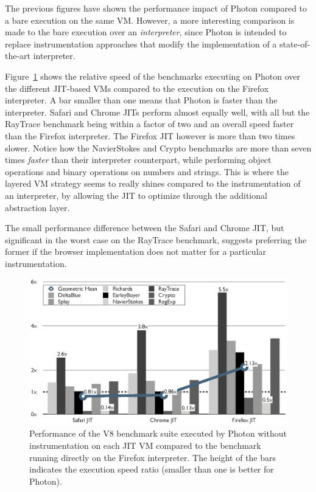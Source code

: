 The previous figures have shown the performance impact of Photon compared to a
bare execution on the same VM. However, a more interesting comparison is made
to the bare execution over an \textit{interpreter}, since Photon is intended to
replace instrumentation approaches that modify the implementation of a
state-of-the-art interpreter.

Figure~\ref{fig:perf-no-instrumentation-photon-vs-interpreter} shows the
relative speed of the benchmarks executing on Photon over the different
JIT-based VMs compared to the execution on the Firefox interpreter. A bar
smaller than one means that Photon is faster than the interpreter. Safari and
Chrome JITs perform almost equally well, with all but the RayTrace benchmark
being within a factor of two and an overall speed faster than the Firefox
interpreter. The Firefox JIT however is more than two times slower. Notice how
the NavierStokes and Crypto benchmarks are more than seven times \textit{faster}
than their interpreter counterpart, while performing object operations and
binary operations on numbers and strings. This is where the layered VM strategy
seems to really shines compared to the instrumentation of an interpreter, by
allowing the JIT to optimize through the additional abstraction layer.

The small performance difference between the Safari and Chrome JIT, but
significant in the worst case on the RayTrace benchmark, suggests preferring the
former if the browser implementation does not matter for a particular
instrumentation.



\begin{figure}[htbp]
\begin{center}
\includegraphics[width=.85\textwidth]{figures/ComparisonToInterpreter}
\caption[Performance of the V8 benchmark suite executed by Photon without instrumentation]{Performance of the V8 benchmark suite executed by Photon without instrumentation
on each JIT VM compared to the benchmark running directly on the Firefox interpreter.  The height of the bars
indicates the execution speed ratio (smaller than one is better for Photon).}
\label{fig:perf-no-instrumentation-photon-vs-interpreter}
\end{center}
\end{figure}

